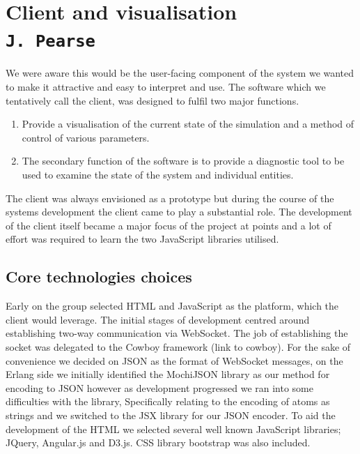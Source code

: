 \pagestyle{empty}
\section{Client and visualisation\\{\small\tt{J.~Pearse}}}
\label{client}
\label{client_doc}
We were aware this would be the user-facing component of the system we wanted to make it attractive and easy to interpret and use.
The software which we tentatively call the client, was designed to fulfil two major functions.
\begin{enumerate}
  \item{Provide a visualisation of the current state of the simulation and a method of control of various parameters.}
  \item{The secondary function of the software is to provide a diagnostic tool to be used to examine the state of the system and individual entities.}
\end{enumerate}
The client was always envisioned as a prototype but during the course of the systems development the client came to play a substantial role. The development of the client itself became a major focus of the project at points and a lot of effort was required to learn the two JavaScript libraries utilised.
\subsection{Core technologies choices}
Early on the group selected HTML and JavaScript as the platform, which the client would leverage. The initial stages of development centred around establishing two-way communication via WebSocket. The job of establishing the socket was delegated to the Cowboy framework (link to cowboy). For the sake of convenience we decided on JSON as the format of WebSocket messages, on the Erlang side we initially identified the MochiJSON library as our method for encoding to JSON however as development progressed we ran into some difficulties with the library, Specifically relating to the encoding of atoms as strings and we switched to the JSX library for our JSON encoder.
To aid the development of the HTML we selected several well known JavaScript libraries; JQuery, Angular.js and D3.js. CSS library bootstrap was also included.
